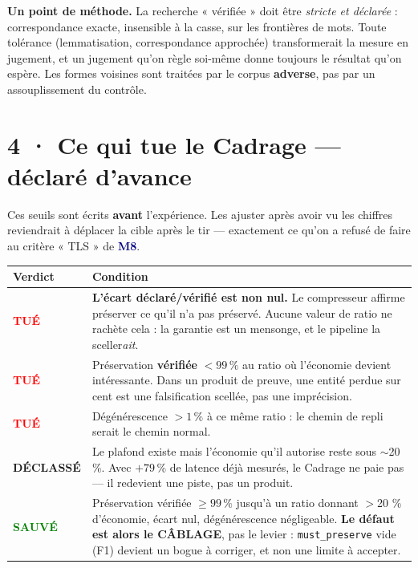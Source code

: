 \documentclass[10pt]{article}
\newcommand{\best}[1]{\textcolor{green}{\textbf{#1}}}
\newcommand{\pire}[1]{\textcolor{red}{\textbf{#1}}}
\newcommand{\code}[1]{\texttt{\small #1}}
\newcommand{\mm}[1]{\textbf{\textcolor{navy}{#1}}}
\begin{document}
\textbf{Un point de méthode.} La recherche « vérifiée » doit être \emph{stricte et déclarée} :
correspondance exacte, insensible à la casse, sur les frontières de mots. Toute tolérance
(lemmatisation, correspondance approchée) transformerait la mesure en jugement, et un jugement qu'on
règle soi-même donne toujours le résultat qu'on espère. Les formes voisines sont traitées par le
corpus \textbf{adverse}, pas par un assouplissement du contrôle.

\section{4 · Ce qui tue le Cadrage --- déclaré d'avance}

\begin{alerte}
Ces seuils sont écrits \textbf{avant} l'expérience. Les ajuster après avoir vu les chiffres
reviendrait à déplacer la cible après le tir --- exactement ce qu'on a refusé de faire au critère
« TLS » de \mm{M8}.
\end{alerte}

\begin{center}\small
\renewcommand{\arraystretch}{1.25}
\begin{tabular}{@{}>{\raggedright\arraybackslash}p{4.2cm} >{\raggedright\arraybackslash}p{11.6cm}@{}}
\toprule
\textbf{Verdict} & \textbf{Condition} \\
\midrule
\pire{TUÉ} & \textbf{L'écart déclaré/vérifié est non nul.} Le compresseur affirme préserver ce qu'il n'a pas préservé. Aucune valeur de ratio ne rachète cela : la garantie est un mensonge, et le pipeline la sceller\emph{ait}. \\
\pire{TUÉ} & Préservation \textbf{vérifiée} $< 99\,\%$ au ratio où l'économie devient intéressante. Dans un produit de preuve, une entité perdue sur cent est une falsification scellée, pas une imprécision. \\
\pire{TUÉ} & Dégénérescence $> 1\,\%$ à ce même ratio : le chemin de repli serait le chemin normal. \\
\midrule
\textbf{DÉCLASSÉ} & Le plafond existe mais l'économie qu'il autorise reste sous $\sim$20 \%. Avec $+79\,\%$ de latence déjà mesurés, le Cadrage ne paie pas --- il redevient une piste, pas un produit. \\
\midrule
\best{SAUVÉ} & Préservation vérifiée $\geq 99\,\%$ jusqu'à un ratio donnant $>$20 \% d'économie, écart nul, dégénérescence négligeable. \textbf{Le défaut est alors le CÂBLAGE}, pas le levier : \code{must\_preserve} vide (F1) devient un bogue à corriger, et non une limite à accepter. \\
\bottomrule
\end{tabular}
\end{center}
\end{document}
